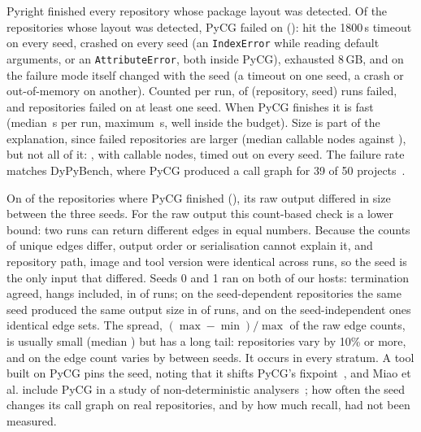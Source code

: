 \documentclass[conference]{IEEEtran}
\begin{document}
Pyright finished every repository whose
package layout was detected. Of the \nPycgRun{} repositories whose layout was
detected, PyCG failed on \nPycgFail{} (\pctPycgFailRun): \nFailTimeout{} hit the 1800\,s timeout on every seed,
\nFailCrash{} crashed on every seed (an \texttt{IndexError} while reading default arguments, or an
\texttt{AttributeError}, both inside PyCG), \nFailOom{} exhausted 8\,GB, and on \nFailMixed{} the
failure mode itself changed with the seed (a timeout on one seed, a crash or out-of-memory on
another). Counted per run, \pctPycgSeedRunsFailed{} of (repository, seed) runs failed, and
\nPycgAnySeedFail{} repositories failed on at least one seed. When PyCG finishes it is fast (median \pycgMedSec{}\,s per run, maximum
\pycgMaxSec{}\,s, well inside the budget). Size is part of the
explanation, since failed repositories are larger (median \medNodesFail{} callable nodes against
\medNodesOk{}), but not all of it: \texttt{\minNodesFailRepo}, with \minNodesFail{} callable
nodes, timed out on every seed. The failure rate matches DyPyBench, where PyCG produced a call
graph for 39 of 50 projects~\cite{bouzenia2024dypybench}.

On \nNondet{} of the \nStaticOk{} repositories where PyCG finished (\pctNondet{}), its raw output
differed in size between the three seeds. For the raw output this count-based check is a lower bound:
two runs can return different edges in equal numbers. Because the counts of unique edges differ, output order or
serialisation cannot explain it, and repository path, image and tool version were identical
across runs, so the seed is the only input that differed. Seeds 0
and 1 ran on both of our hosts: termination agreed, hangs included, in \nRepeatSeedAgree{} of
\nRepeatSeedRuns{} runs; on the \nRepeatNondetRepos{} seed-dependent repositories the same seed
produced the same output size in \nRepeatNondetEqual{} of \nRepeatNondetRuns{} runs, and on the
\nRepeatEdgeIdentical{} seed-independent ones identical edge sets. The spread, $(\max-\min)/\max$ of the raw edge counts, is usually small (median \medSpread{}) but
has a long tail: \nSpreadTen{} repositories vary by 10\% or more, and on \texttt{\maxSpreadRepo}
the edge count varies by \maxSpread{} between seeds. It occurs in every stratum. A tool built on PyCG
pins the seed, noting that it shifts PyCG's fixpoint~\cite{codeanalyzer2025seed}, and Miao et al. include PyCG in a study of
non-deterministic analysers~\cite{miao2025nondet}; how often the seed changes its call graph on real
repositories, and by how much recall, had not been measured.
\end{document}
